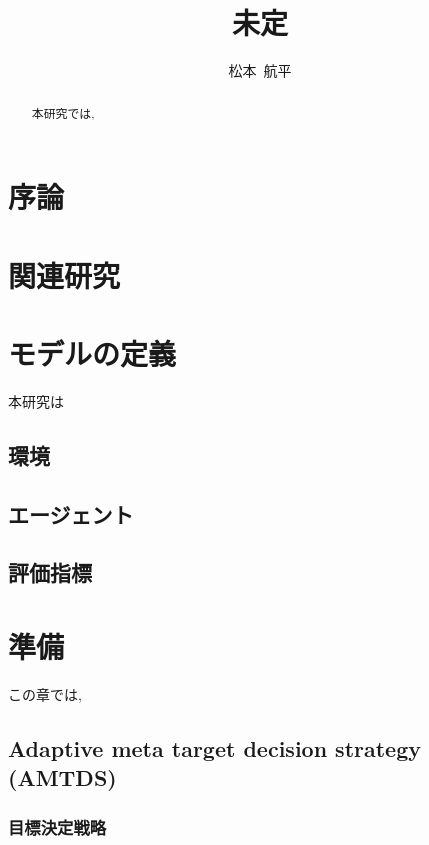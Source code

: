 \documentclass[12pt,a4j,twoside]{jarticle}
\title{未定}{5}
\author{松本~航平}
\begin{document}
\maketitle

\begin{abstract}
  本研究では,
\end{abstract}

\vspace*{1cm}
\section{序論}

\section{関連研究}

\section{モデルの定義}
本研究は

\subsection{環境}

\subsection{エージェント}

\subsection{評価指標}


\section{準備}
この章では,

\subsection{Adaptive meta target decision strategy (AMTDS)}

\subsubsection{目標決定戦略}
\end{document}
